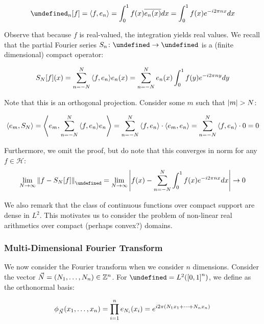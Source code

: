 \documentclass[12pt]{article}
\let\H\undefined
\newcommand{\H}{\mathcal{H}}
\let\F\undefined
\newcommand{\F}{\mathcal{F}}
\begin{document}
\begin{align*}
  \F_n\brackets{f}
    = \inner{f, e_n}
    = \int_0^1 f\parens{x} \overline{e_n \parens{x}} dx
    = \int_0^1 f\parens{x} e^{-i 2 \pi n x} dx
\end{align*}

Observe that because $f$ is real-valued, the integration yields real values.
We recall that the partial Fourier series $\type{S_n}{\H}{\H}$ is a
(finite dimensional) compact operator:

\begin{align*}
  S_N {\left[f\right]} {\left(x\right)}
    = \sum_{n = -N}^{N} {\left\langle f, e_n\right\rangle} e_n {\left(x\right)}
    = \sum_{n = -N}^{N} e_n {\left(x\right)} \int_0^1 f(y) e^{- i 2 \pi n y} dy
\end{align*}

Note that this is an orthogonal projection.
Consider some $m$ such that
${\left\lvert m\right\rvert} > N$:

\begin{align*}
  {\left\langle e_m, S_N\right\rangle}
    = {\left\langle e_m, \sum_{n = -N}^{N} {\left\langle f, e_n\right\rangle} e_n\right\rangle}
    = \sum_{n = -N}^{N} {\left\langle f, e_n\right\rangle} \cdot {\left\langle e_m, e_n\right\rangle}
    = \sum_{n = -N}^{N} {\left\langle f, e_n\right\rangle} \cdot 0
    = 0
\end{align*}

Furthermore, we omit the proof, but do note that this converges in norm
for any $f \in \mathcal{H}$:
\begin{align*}
  \lim_{N \to \infty} \norm{f - S_N \brackets{f}}_{\H}
    = \lim_{N \to \infty}
      \abs{f\parens{x} -
            \sum_{n = -N}^{N} \int_0^1 f\parens{x} e^{-i 2\pi nx} dx}
    \to 0
\end{align*}

We also remark that the class of continuous functions over
compact support are dense in $L^2$.
This motivates us to consider the problem of non-linear real arithmetics
over compact (perhaps convex?) domains.


\subsubsection{Multi-Dimensional Fourier Transform}
We now consider the Fourier transform when we consider $n$ dimensions.
Consider the vector $\vec{N} = {\left(N_1, \ldots, N_n\right)} \in {\mathbb{Z}}^n$.
For $\H = L^2 \parens{\brackets{0, 1}^n}$,
we define as the orthonormal basis:

\begin{align*}
  \phi_{\vec{N}} {\left(x_1, \ldots, x_n\right)}
    = \prod_{i = 1}^{n} e_{N_i} {\left(x_i\right)}
    = e^{i 2 \pi {\left(N_1 x_1 + \cdots + N_n x_n\right)}}
\end{align*}
\end{document}
